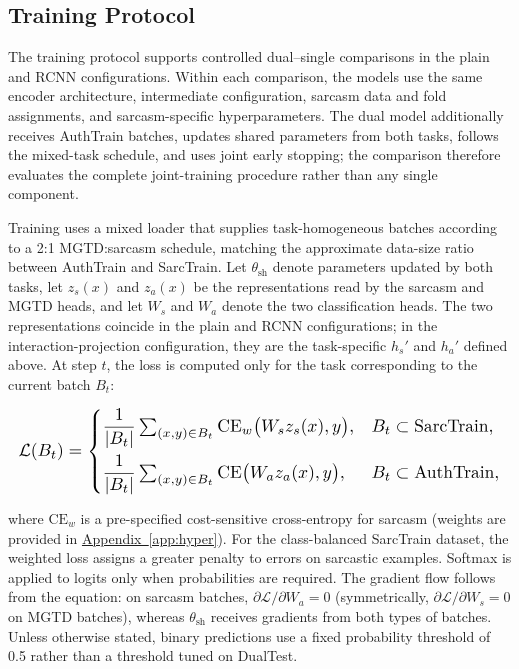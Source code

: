 \documentclass[11pt]{article}
\newcommand{\Appref}[1]{\hyperref[#1]{Appendix~\ref*{#1}}}
\begin{document}
\subsection{Training Protocol}
\label{sec:model-train}

The training protocol supports controlled dual--single comparisons in the plain and RCNN configurations. Within each comparison, the models use the same encoder architecture, intermediate configuration, sarcasm data and fold assignments, and sarcasm-specific hyperparameters. The dual model additionally receives AuthTrain batches, updates shared parameters from both tasks, follows the mixed-task schedule, and uses joint early stopping; the comparison therefore evaluates the complete joint-training procedure rather than any single component.

Training uses a mixed loader that supplies task-homogeneous batches according to a 2:1 MGTD:sarcasm schedule, matching the approximate data-size ratio between AuthTrain and SarcTrain. Let $\theta_{\mathrm{sh}}$ denote parameters updated by both tasks, let $z_s(x)$ and $z_a(x)$ be the representations read by the sarcasm and MGTD heads, and let $W_s$ and $W_a$ denote the two classification heads. The two representations coincide in the plain and RCNN configurations; in the interaction-projection configuration, they are the task-specific $h_s'$ and $h_a'$ defined above. At step $t$, the loss is computed only for the task corresponding to the current batch $B_t$:

\begin{equation}
\label{eq:loss}
\resizebox{\columnwidth}{!}{$\displaystyle
\mathcal{L}(B_t)=
\begin{cases}
\dfrac{1}{|B_t|}\sum_{(x,y)\in B_t}\mathrm{CE}_{w}\bigl(W_s z_s(x), y\bigr), & B_t\subset \text{SarcTrain},\\[9pt]
\dfrac{1}{|B_t|}\sum_{(x,y)\in B_t}\mathrm{CE}\bigl(W_a z_a(x), y\bigr), & B_t\subset \text{AuthTrain},
\end{cases}$}
\end{equation}

where $\mathrm{CE}_w$ is a pre-specified cost-sensitive cross-entropy for sarcasm (weights are provided in \Appref{app:hyper}). For the class-balanced SarcTrain dataset, the weighted loss assigns a greater penalty to errors on sarcastic examples. Softmax is applied to logits only when probabilities are required. The gradient flow follows from the equation: on sarcasm batches, $\partial\mathcal{L}/\partial W_a = 0$ (symmetrically, $\partial\mathcal{L}/\partial W_s = 0$ on MGTD batches), whereas $\theta_{\mathrm{sh}}$ receives gradients from both types of batches. Unless otherwise stated, binary predictions use a fixed probability threshold of 0.5 rather than a threshold tuned on DualTest.
\end{document}
